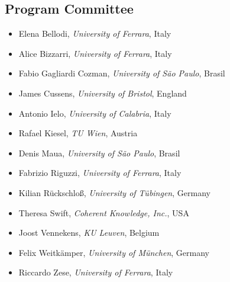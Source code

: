 \documentclass[
]{ceurart}
\begin{document}
\subsection*{Program Committee}
\begin{itemize}
  \item Elena Bellodi, \emph{University of Ferrara}, Italy
  \item Alice Bizzarri, \emph{University of Ferrara}, Italy
  \item Fabio Gagliardi Cozman, \emph{University of São Paulo}, Brasil
  \item James Cussens, \emph{University of Bristol}, England
  \item Antonio Ielo, \emph{University of Calabria}, Italy
  \item Rafael Kiesel, \emph{TU Wien}, Austria
  \item Denis Maua, \emph{University of São Paulo}, Brasil
  \item Fabrizio Riguzzi, \emph{University of Ferrara}, Italy
  \item Kilian Rückschloß, \emph{University of Tübingen}, Germany
  \item Theresa Swift, \emph{Coherent Knowledge, Inc.}, USA
  \item Joost Vennekens, \emph{KU Leuven}, Belgium
  \item Felix Weitkämper, \emph{University of München}, Germany
  \item Riccardo Zese, \emph{University of Ferrara}, Italy
\end{itemize}



\end{document}
